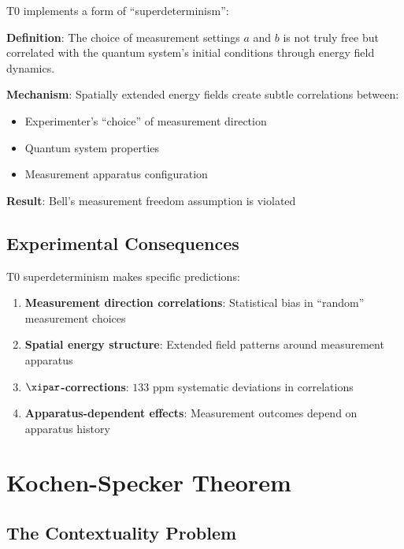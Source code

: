 	T0 implements a form of ``superdeterminism'':
	
	\begin{tcolorbox}[colback=blue!5!white,colframe=blue!75!black,title=T0 Superdeterminism]
		\textbf{Definition}: The choice of measurement settings $a$ and $b$ is not truly free but correlated with the quantum system's initial conditions through energy field dynamics.
		
		\textbf{Mechanism}: Spatially extended energy fields create subtle correlations between:
		\begin{itemize}
			\item Experimenter's ``choice'' of measurement direction
			\item Quantum system properties
			\item Measurement apparatus configuration
		\end{itemize}
		
		\textbf{Result}: Bell's measurement freedom assumption is violated
	\end{tcolorbox}
	
	\subsection{Experimental Consequences}
	
	T0 superdeterminism makes specific predictions:
	
	\begin{enumerate}
		\item \textbf{Measurement direction correlations}: Statistical bias in ``random'' measurement choices
		\item \textbf{Spatial energy structure}: Extended field patterns around measurement apparatus
		\item \textbf{$\xipar$-corrections}: $133$ ppm systematic deviations in correlations
		\item \textbf{Apparatus-dependent effects}: Measurement outcomes depend on apparatus history
	\end{enumerate}
	
	\section{Kochen-Specker Theorem}
	
	\subsection{The Contextuality Problem}
	
